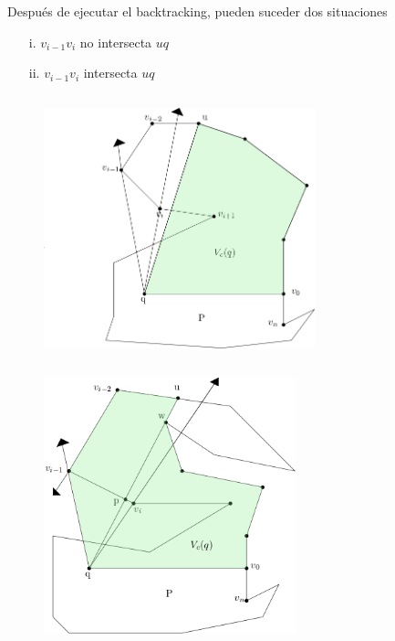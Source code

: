 \documentclass[aspectratio=169,xcolor=dvipsnames, t]{beamer}
\begin{document}
\begin{frame}%
    Después de ejecutar el backtracking, pueden suceder dos situaciones
    \begin{center}
        \begin{enumerate}
            \item [i.] $v_{i-1}v_{i}$ no intersecta $uq$
            \item [ii.] $v_{i-1}v_{i}$ intersecta $uq$
        \end{enumerate}
    \end{center}
        \begin{column}{0.45\textwidth}
          \begin{figure}
            \vspace{-0.5cm}
          \centering
          \includegraphics[width=0.7\textwidth]{imagenes/Caso2.5b.png}
        \end{figure}
      \end{column}
          \begin{column}{0.45\textwidth}
            \begin{figure}
              \vspace{-1cm}
          \centering
          \includegraphics[width=0.65\textwidth]{imagenes/Caso2.7a.png}
        \end{figure}
      \end{column}
\end{frame}
\end{document}
